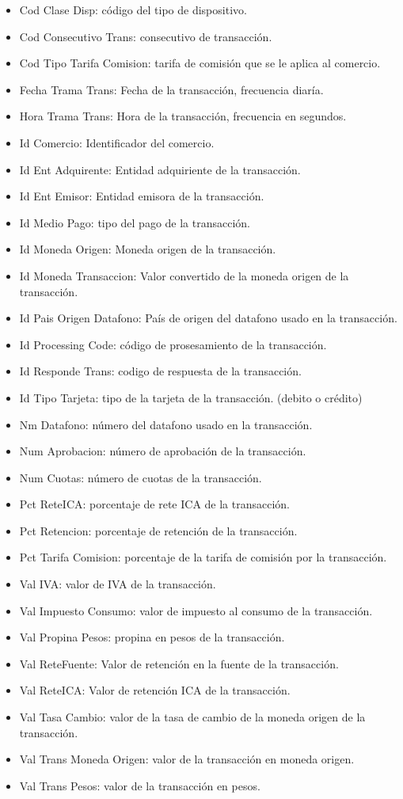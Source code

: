 \documentclass[a4paper]{article}
\begin{document}
\begin{multicols}{2}
\begin{itemize}
	\item Cod Clase Disp: código del tipo de dispositivo.
	\item Cod Consecutivo Trans: consecutivo de transacción.
	\item Cod Tipo Tarifa Comision: tarifa de comisión que se le aplica al comercio.
	\item Fecha Trama Trans: Fecha de la transacción, frecuencia diaría.
	\item Hora Trama Trans: Hora de la transacción, frecuencia en segundos.
	\item Id Comercio: Identificador del comercio.
	\item Id Ent Adquirente: Entidad adquiriente de la transacción.
	\item Id Ent Emisor: Entidad emisora de la transacción.
	\item Id Medio Pago: tipo del pago de la transacción.
	\item Id Moneda Origen: Moneda origen de la transacción.
	\item Id Moneda Transaccion: Valor convertido de la moneda origen de la transacción.
	\item Id Pais Origen Datafono: País de origen del datafono usado en la transacción.
	\item Id Processing Code: código de prosesamiento de la transacción.
	\item Id Responde Trans: codigo de respuesta de la transacción.
	\item Id Tipo Tarjeta: tipo de la tarjeta de la transacción. (debito o crédito)
	\item Nm Datafono: número del datafono usado en la transacción.
	\item Num Aprobacion: número de aprobación de la transacción.
	\item Num Cuotas: número de cuotas de la transacción.
	\item Pct ReteICA: porcentaje de rete ICA de la transacción.
	\item Pct Retencion: porcentaje de retención de la transacción.
	\item Pct Tarifa Comision: porcentaje de la tarifa de comisión por la transacción.
	\item Val IVA: valor de IVA de la transacción.
	\item Val Impuesto Consumo: valor de impuesto al consumo de la transacción.
	\item Val Propina Pesos: propina en pesos de la transacción.
	\item Val ReteFuente: Valor de retención en la fuente de la transacción.
	\item Val ReteICA: Valor de retención ICA de la transacción.
	\item Val Tasa Cambio: valor de la tasa de cambio de la moneda origen de la transacción.
	\item Val Trans Moneda Origen: valor de la transacción en moneda origen.
	\item Val Trans Pesos: valor de la transacción en pesos.
\end{itemize}
\end{multicols}
\end{document}
